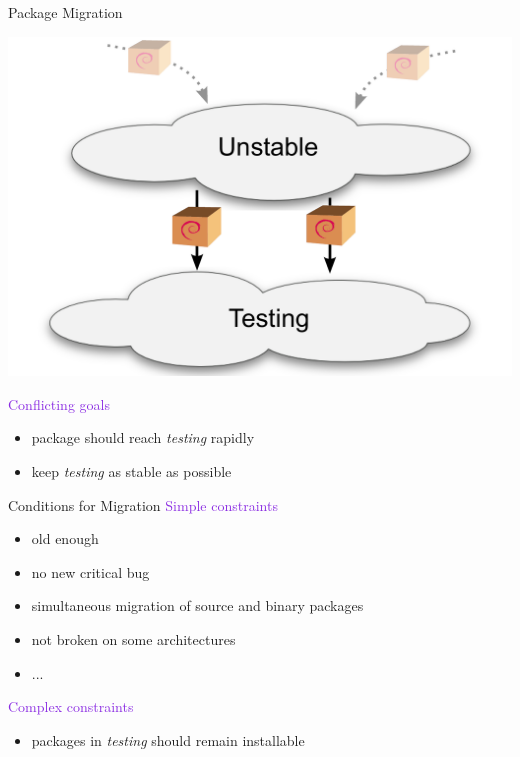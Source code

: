 \documentclass[xcolor={dvipsnames}]{beamer}
\newcommand{\EEE}[1]{\textcolor{BlueViolet}{#1}}
\begin{document}
\begin{frame}{Package Migration}

\begin{center}
\includegraphics[width=0.7\linewidth]{migration}
\end{center}

\vspace{-1em}
\EEE{Conflicting goals}
\begin{itemize}
\item package should reach \textit{testing} rapidly
\item keep \textit{testing} as stable as possible
\end{itemize}

\end{frame}

\begin{frame}{Conditions for Migration}
\EEE{Simple constraints} %
\begin{itemize}
\item old enough
\item no new critical bug
\item simultaneous migration of source and binary packages
\item not broken on some architectures
\item ...
\end{itemize}

\vspace{1em}

\EEE{Complex constraints}
\begin{itemize}
\item packages in \textit{testing} should remain installable
\end{itemize}
\end{frame}
\end{document}
